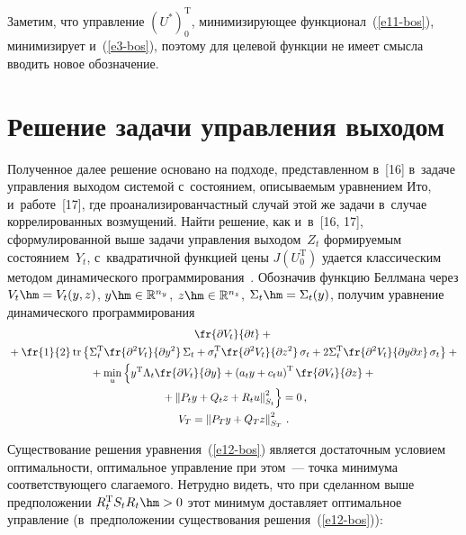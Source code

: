 \begin{multicols}{2}
     
     \smallskip
     
     Заметим, что управление $(U^*)_0^{\mathrm{T}}$, ми\-ни\-ми\-зи\-ру\-ющее 
функционал~(\ref{e11-bos}), минимизирует и~(\ref{e3-bos}), поэтому для 
целевой функции не имеет смысла вводить новое обозначение.
     
\section{Решение задачи управления выходом}

     Полученное далее решение основано на подходе, представленном 
в~[16] в~задаче управления вы\-ходом системой с~состоянием, описываемым 
урав\-нением Ито, и~работе~[17], где проанализирован\linebreak частный случай этой же 
задачи в~случае коррелированных возмущений. Найти решение, как и~в~[16, 
17], сформулированной выше задачи управления выходом~$Z_t$ 
формируемым состоянием~$Y_t$, с~квадратичной функцией цены 
$J(U_0^{\mathrm{T}})$ удается классическим методом динамического  
программирования~\cite{4-bos, 5-bos}. Обозначив функцию Беллмана через 
$V_t\hm= V_t(y,z)$, $y\hm\in \mathbb{R}^{n_y}$, $z\hm\in 
\mathbb{R}^{n_z}$, $\Sigma_t\hm= \Sigma_t(y)$, получим уравнение 
динамического программирования
     \begin{multline}
     \fr{\partial V_t}{\partial t} +{}\\
     {}+\fr{1}{2}\,\mathrm{tr}\left\{ \Sigma_t^{\mathrm{T}} 
\fr{\partial^2 V_t}{\partial y^2}\,\Sigma_t +\sigma_t^{\mathrm{T}} \fr{\partial^2V_t}{\partial 
z^2}\,\sigma_t +2\Sigma_t^{\mathrm{T}}\fr{\partial^2 V_t}{\partial 
y\partial x}\,\sigma_t\right\}+{}\\
     {}+\min\limits_u \left\{ y^{\mathrm{T}} \Lambda_t \fr{\partial V_t}{\partial y} +\left( 
a_t y +c_t u\right)^{\mathrm{T}}\fr{\partial V_t}{\partial z} +{}\right.\\
\left.{}+\left\| P_t y+Q_tz +R_t 
u\right\|^2_{S_t}\!
\vphantom{\fr{\partial V_t}{\partial y}}
\right\}=0\,,\\ 
     V_T=\left\| P_T y +Q_T z\right\|^2_{S_T}\,.
          \label{e12-bos}
\end{multline}
     
     Существование решения уравнения~(\ref{e12-bos}) является 
достаточным условием оптимальности, оптимальное управление при 
этом~--- точка минимума соответствующего слагаемого. Нетрудно видеть,\linebreak 
что при сделанном выше предположении $R_t^{\mathrm{T}} S_t R_t\hm>0$ этот 
минимум доставляет оптимальное управ\-ле\-ние (в~предположении 
существования решения~(\ref{e12-bos})):


\end{multicols}
